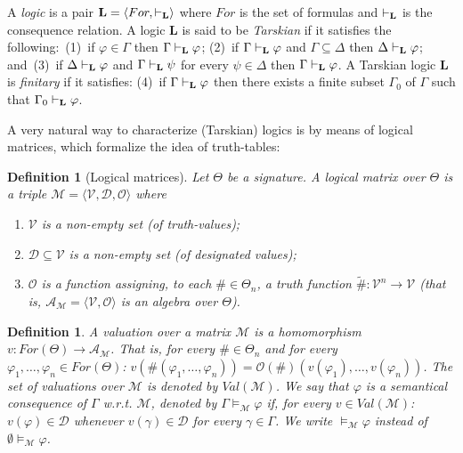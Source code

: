 \documentclass[12pt]{article}
\newtheorem{definition}[theorem]{Definition}
\begin{document}
A  {\em logic}  is a pair ${\bf L}=\langle For,\vdash_{\bf L}\rangle$ where $For$ is the set of formulas and $\vdash_{\bf L}$ is the consequence relation. A logic {\bf L} is said to be {\em Tarskian} if it satisfies the following:~(1)~if $\varphi \in \Gamma$ then $\Gamma \vdash_{\bf L} \varphi$; (2)~if $\Gamma \vdash_{\bf L} \varphi$ and $\Gamma \subseteq \Delta$ then $\Delta \vdash_{\bf L} \varphi$; and~(3)~if $\Delta \vdash_{\bf L} \varphi$ and $\Gamma \vdash_{\bf L} \psi$ for every $\psi \in \Delta$ then $\Gamma \vdash_{\bf L} \varphi$. A Tarskian logic {\bf L} is  {\em finitary} if it satisfies: (4)~if $\Gamma \vdash_{\bf L} \varphi$ then there exists  a finite subset $\Gamma_0$ of $\Gamma$ such that $\Gamma_0 \vdash_{\bf L} \varphi$.

A very natural way to characterize (Tarskian) logics is by means of logical matrices, which formalize the idea of truth-tables:

   \begin{definition}[Logical matrices]
        Let $\Theta$ be a signature. A {\em   logical matrix} over $\Theta$ is a triple $\mathcal{M} = \langle \mathcal{V},\mathcal{D},\mathcal{O} \rangle$ where 
        \begin{enumerate}
            \item $\mathcal{V}$ is a non-empty set (of truth-values);
            \item $\mathcal{D} \subseteq \mathcal{V}$ is a non-empty set (of designated values);
            \item $\mathcal{O}$ is a function assigning, to each $\# \in\Theta_n$, a truth function $\tilde {\#} : \mathcal{V}^{n} \rightarrow \mathcal{V}$ (that is, $\mathcal{A}_\mathcal{M}=\langle \mathcal{V},\mathcal{O} \rangle$ is an algebra over $\Theta$).
        \end{enumerate}
\end{definition} 

\begin{definition} \label{conseq-mat}        
    A  valuation over a matrix $\mathcal{M}$ is a homomorphism $v:For(\Theta) \to \mathcal{A}_\mathcal{M}$. That is, for every $\# \in\Theta_n$ and for every $\varphi_1,\ldots,\varphi_n \in For(\Theta)$: $v(\#(\varphi_1, \ldots,\varphi_n))=\mathcal{O}(\#)(v(\varphi_1), \ldots,v(\varphi_n))$. The set of valuations over $\mathcal{M}$  is denoted by $Val(\mathcal{M})$.  We say that $\varphi$ is a semantical consequence of $\Gamma$ w.r.t. $\mathcal{M}$, denoted by $\Gamma \models_{\mathcal{M}} \varphi$ if, for every $v \in Val(\mathcal{M})$: $v(\varphi) \in \mathcal{D}$ whenever $v(\gamma) \in \mathcal{D}$ for every $\gamma \in \Gamma$. We write $\models_{\mathcal{M}} \varphi$ instead of  $\emptyset\models_{\mathcal{M}} \varphi$.
    \end{definition}   
\end{document}
